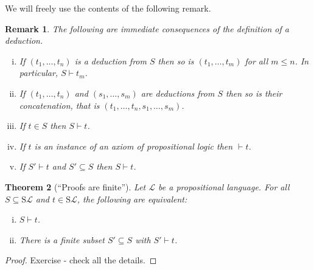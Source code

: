 \documentclass[11pt]{article}
\newcommand{\PF}{\mathrm{S}}
\newcommand{\proves}{\vdash}
\newtheorem{theorem}{Theorem}[section]
\newtheorem{remark}[theorem]{Remark}
\newcommand{\mcal}[1]{\mathcal{#1}}
\begin{document}

We will freely use the contents of the following remark.
\begin{remark}\label{deductionrem}
The following are immediate consequences of the definition of a deduction.
\begin{enumerate}[(i)]
\item If $(t_1,\ldots,t_n)$ is a deduction from $S$ then so is $(t_1,\ldots, t_m)$ for all $m\leq n$. In particular, $S\vdash t_m$.
\item If $(t_1,\ldots, t_n)$ and $(s_1,\dots, s_m)$ are deductions from $S$ then so is their concatenation, that is $(t_1,\ldots,t_n,s_1,\ldots,s_m)$.
\item If $t\in S$ then $S\vdash t$.
\item If $t$ is an instance of an axiom of propositional logic then $\proves t$.
\item If $S'\proves t$ and $S'\subseteq S$ then $S\proves t$.
\end{enumerate}
\end{remark}

\begin{theorem}[``Proofs are finite'']
Let $\mcal{L}$ be a propositional language. For all $S\subseteq \PF\mcal{L}$ and $t\in \PF\mcal{L}$, the following are equivalent:
\begin{enumerate}[(i)]
\item $S\proves t$.
\item There is a finite subset $S'\subseteq S$ with $S'\proves t$.
\end{enumerate}
\end{theorem}
\begin{proof}
Exercise - check all the details.
\end{proof}
\end{document}
